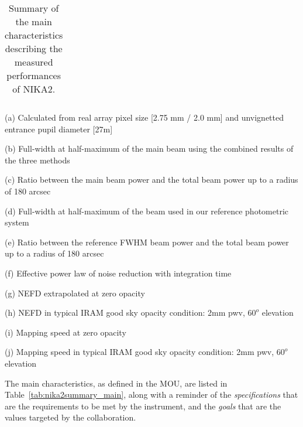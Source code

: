 \begin{table}[h]
\begin{center}
\begin{threeparttable}
\begin{tabular}{|r|c|c|c|c|l|}
\end{tabular}
  \begin{tablenotes}
{\small     
  \item[(a)] Calculated from real array pixel size [2.75 mm / 2.0 mm] and unvignetted entrance pupil diameter [27m]
  \item[(b)] Full-width at half-maximum of the main beam using the combined results of the three methods
  \item[(c)] Ratio between the main beam power and the total beam power up to a radius of 180 arcsec
  \item[(d)] Full-width at half-maximum of the beam used in our reference photometric system
  \item[(e)] Ratio between the reference FWHM beam power and the total beam power up to a radius of 180 arcsec 
  \item[(f)] Effective power law of noise reduction with integration time
  \item[(g)] NEFD extrapolated at zero opacity
  \item[(h)] NEFD in typical IRAM good sky opacity condition: 2mm pwv, $60^o$ elevation
  \item[(i)] Mapping speed at zero opacity
  \item[(j)] Mapping speed in typical IRAM good sky opacity condition: 2mm pwv, $60^o$ elevation
}
  \end{tablenotes}
\end{threeparttable}
\caption[Main performance measurements]{Summary of the main characteristics describing the measured 
performances of NIKA2.}
\label{tab:nika2summary}
\end{center}  
\end{table}


The main characteristics, as defined in the MOU, are listed in
Table~\ref{tab:nika2summary_main}, along with a reminder of
the \emph{specifications} that are the requirements to be met by the
instrument, and the \emph{goals} that are the values targeted by the
collaboration.


